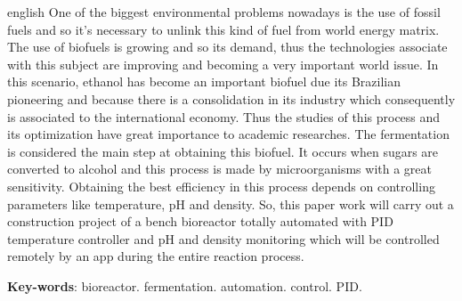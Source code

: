 \begin{resumo}[Abstract]
 \begin{otherlanguage*}{english}
   One of the biggest environmental problems nowadays is the use of fossil fuels and so it’s necessary to unlink this kind of fuel from world energy matrix. The use of biofuels is growing and so its demand, thus the technologies associate with this subject are improving and becoming a very important world issue. In this scenario, ethanol has become an important biofuel due its Brazilian pioneering and because there is a consolidation in its industry which consequently is associated to the international economy. Thus the studies of this  process and its optimization have great importance to academic researches. The fermentation is considered the main step at obtaining this biofuel. It occurs when sugars are converted to alcohol and this process is made by microorganisms with a great sensitivity. Obtaining the best efficiency in this process depends on controlling parameters like temperature, pH and density. So, this paper work will carry out a construction project of a bench bioreactor totally automated with PID temperature controller and pH and density monitoring which will be controlled remotely by an app during the entire reaction process.


   \vspace{\onelineskip}

   \noindent
   \textbf{Key-words}: bioreactor. fermentation. automation. control. PID.

 \end{otherlanguage*}
\end{resumo}
